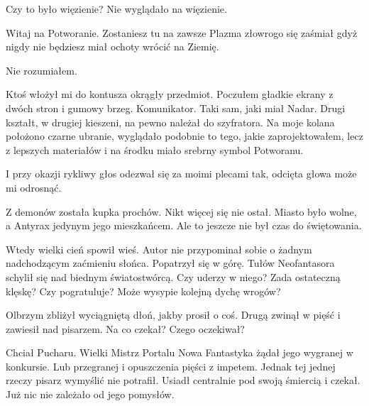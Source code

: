 Czy to było więzienie? Nie wyglądało na więzienie.
\begin{dialogue}
\ds{} Witaj na Potworanie. Zostaniesz tu na zawsze \dm{} Plazma złowrogo się zaśmiał \dm{} gdyż nigdy nie będziesz miał ochoty wrócić na Ziemię.
\end{dialogue}
Nie rozumiałem.

Ktoś włożył mi do kontusza okrągły przedmiot.
Poczułem gładkie ekrany z dwóch stron i gumowy brzeg.
Komunikator. Taki sam, jaki miał Nadar.
Drugi kształt, w drugiej kieszeni, na pewno należał do szyfratora.
Na moje kolana położono czarne ubranie, wyglądało podobnie to tego, jakie zaprojektowałem, lecz z lepszych materiałów i na środku miało srebrny symbol Potworanu.

\begin{dialogue}
\ds{} I przy okazji \dm{} rykliwy głos odezwał się za moimi plecami \dm{} tak, odcięta głowa może mi odrosnąć.
\end{dialogue}

\divider{}

Z demonów została kupka prochów.
Nikt więcej się nie ostał. Miasto było wolne, a Antyrax jedynym jego mieszkańcem.
Ale to jeszcze nie był czas do świętowania.

Wtedy wielki cień spowił wieś.
Autor nie przypominał sobie o żadnym nadchodzącym zaćmieniu słońca.
Popatrzył się w górę.
Tułów Neofantasora schylił się nad biednym światostwórcą.
Czy uderzy w niego? Zada ostateczną klęskę? Czy pogratuluje? Może wysypie kolejną dychę wrogów?

Olbrzym zbliżył wyciągniętą dłoń, jakby prosił o coś.
Drugą zwinął w pięść i zawiesił nad pisarzem.
Na co czekał? Czego oczekiwał?

Chciał Pucharu.
Wielki Mistrz Portalu Nowa Fantastyka żądał jego wygranej w konkursie. 
Lub przegranej i opuszczenia pięści z impetem.
Jednak tej jednej rzeczy pisarz wymyślić nie potrafił.
Usiadł centralnie pod swoją śmiercią i czekał. Już nic nie zależało od jego pomysłów.



